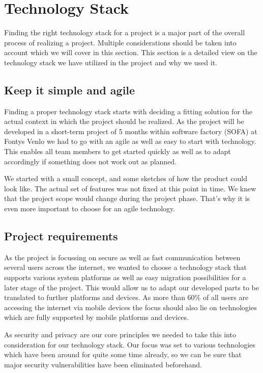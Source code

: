 \chapter{Technology Stack}\label{ch:technology-stack}
Finding the right technology stack for a project is a major part of the overall process of realizing a project.
Multiple considerations should be taken into account which we will cover in this section.
This section is a detailed view on the technology stack we have utilized in the project and why we used it.

\section{Keep it simple and agile}\label{sec:keep-it-simple-and-agile}

Finding a proper technology stack starts with deciding a fitting solution for the actual context in which the project
should be realized.
As the project will be developed in a short-term project of 5 months within software factory (SOFA) at Fontys Venlo we
had to go with an agile as well as easy to start with technology.
This enables all team members to get started quickly as well as to adapt accordingly if something does not work out as
planned.

We started with a small concept, and some sketches of how the product could look like.
The actual set of features was not fixed at this point in time.
We knew that the project scope would change during the project phase.
That's why it is even more important to choose for an agile technology.

\section{Project requirements}\label{sec:project-requirements}

As the project is focussing on secure as well as fast communication between several users across the internet, we wanted
to choose a technology stack that supports various system platforms as well as easy migration possibilities for a later
stage of the project.
This would allow us to adapt our developed parts to be translated to further platforms and devices.
As more than 60\% of all users are accessing the internet via mobile devices the focus should also lie on technologies
which are fully supported by mobile platforms and devices.

As security and privacy are our core principles we needed to take this into consideration for our technology stack.
Our focus was set to various technologies which have been around for quite some time already, so we can be sure that
major security vulnerabilities have been eliminated beforehand.

